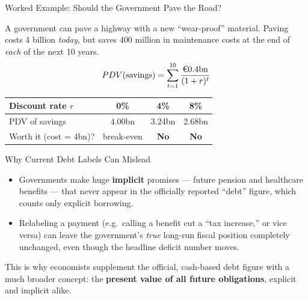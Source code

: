 \documentclass[11pt,aspectratio=169]{beamer}
\begin{document}
\begin{frame}{Worked Example: Should the Government Pave the Road?}

  A government can pave a highway with a new ``wear-proof'' material. Paving costs \texteuro{}4 billion \emph{today}, but saves \texteuro{}400 million in maintenance costs at the end of \emph{each} of the next 10 years.
  \vspace{0.3em}
  \[
    PDV(\text{savings}) = \sum_{t=1}^{10} \frac{\text{\texteuro}0.4\text{bn}}{(1+r)^t}
  \]
  \begin{center}
  \begin{tabular}{@{}lccc@{}}
    \toprule
    Discount rate $r$ & 0\% & 4\% & 8\% \\
    \midrule
    PDV of savings & \texteuro{}4.00bn & \texteuro{}3.24bn & \texteuro{}2.68bn \\
    Worth it (cost = \texteuro{}4bn)? & break-even & \textbf{No} & \textbf{No} \\
    \bottomrule
  \end{tabular}
  \end{center}
  
\end{frame}

\begin{frame}{Why Current Debt Labels Can Mislead}
  
  \begin{itemize}
    \item Governments make huge \textbf{implicit} promises --- future pension and healthcare benefits --- that never appear in the officially reported ``debt'' figure, which counts only explicit borrowing.
    \item Relabeling a payment (e.g.\ calling a benefit cut a ``tax increase,'' or vice versa) can leave the government's \emph{true} long-run fiscal position completely unchanged, even though the headline deficit number moves.
  \end{itemize}
  \vspace{0.3em}
 
  This is why economists supplement the official, cash-based debt figure with a much broader concept: the \textbf{present value of all future obligations}, explicit and implicit alike.\\
 
\end{frame}
\end{document}
